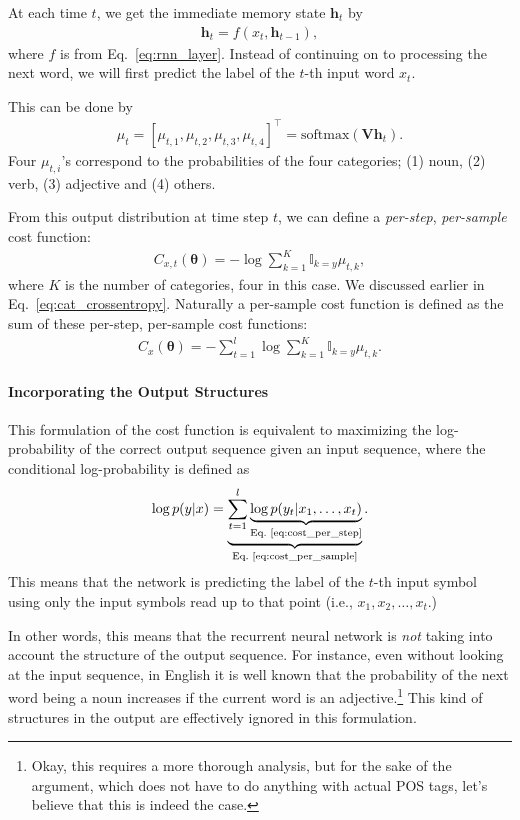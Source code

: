 \documentclass{report}
\newcommand{\softmax}{\text{softmax}}
\newcommand{\vect}[1]{\mathbf{#1}}
\newcommand{\vects}[1]{\boldsymbol{#1}}
\newcommand{\matr}[1]{\mathbf{#1}}
\newcommand{\vh}[0]{\vect{h}}
\newcommand{\mV}[0]{\matr{V}}
\newcommand{\TT}[0]{\vects{\theta}}
\newcommand{\II}[0]{\mathbb{I}}
\begin{document}
At each time $t$, we get the immediate memory state $\vh_t$ by
\begin{align}
    \label{eq:rnn_h_x}
    \vh_t = f(x_t, \vh_{t-1}),
\end{align}
where $f$ is from Eq.~\eqref{eq:rnn_layer}. Instead of continuing on to
processing the next word, we will first predict the label of the $t$-th input
word $x_t$.

This can be done by 
\begin{align}
    \label{eq:rnn_y_h}
    \mu_t = \left[ \mu_{t,1}, \mu_{t,2}, \mu_{t,3}, \mu_{t,4} \right]^\top =
    \softmax(\mV \vh_{t}).
\end{align}
Four $\mu_{t,i}$'s correspond to the probabilities of the four categories; (1)
noun, (2) verb, (3) adjective and (4) others.

From this output distribution at time step $t$, we can define a {\em per-step},
{\em per-sample} cost function:
\begin{align}
    \label{eq:cost_per_step}
    C_{x,t}(\TT) = -\log \sum_{k=1}^K \II_{k=y} \mu_{t,k},
\end{align}
where $K$ is the number of categories, four in this case.  We discussed earlier
in Eq.~\eqref{eq:cat_crossentropy}.
Naturally a per-sample cost function is defined as the sum of these per-step,
per-sample cost functions:
\begin{align}
    \label{eq:cost_per_sample}
    C_x(\TT) = -\sum_{t=1}^l \log \sum_{k=1}^K \II_{k=y} \mu_{t,k}.
\end{align}

\paragraph{Incorporating the Output Structures} 
This formulation of the cost function is equivalent to maximizing the
log-probability of the correct output sequence given an input sequence, where
the conditional log-probability is defined as
\begin{align}
    \label{eq:log_y_x_seq}
    \log p(y|x) = \underbrace{\sum_{t=1}^l \underbrace{\log
    p(y_t|x_1,\ldots,x_t)}_{\text{Eq.~\eqref{eq:cost_per_step}}}}_{
        \text{Eq.~\eqref{eq:cost_per_sample}}}.
\end{align}
This means that the network is predicting the label of the $t$-th input symbol
using only the input symbols read up to that point (i.e., $x_1, x_2, \ldots,
x_t$.)

In other words, this means that the recurrent neural network is {\em not} taking
into account the structure of the output sequence. For instance, even without
looking at the input sequence, in English it is well known that the probability
of the next word being a noun increases if the current word is an
adjective.\footnote{
    Okay, this requires a more thorough analysis, but for the sake of the
    argument, which does not have to do anything with actual POS tags, let's
    believe that this is indeed the case.
} This kind of structures in the output are effectively ignored in this
formulation.
\end{document}
